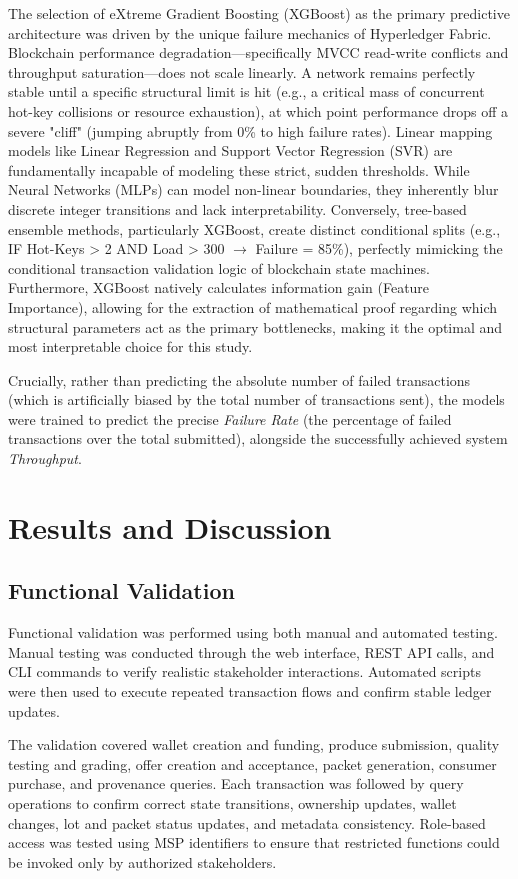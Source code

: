 \documentclass[manuscript,screen]{acmart}
\begin{document}
The selection of eXtreme Gradient Boosting (XGBoost) as the primary predictive architecture was driven by the unique failure mechanics of Hyperledger Fabric. Blockchain performance degradation---specifically MVCC read-write conflicts and throughput saturation---does not scale linearly. A network remains perfectly stable until a specific structural limit is hit (e.g., a critical mass of concurrent hot-key collisions or resource exhaustion), at which point performance drops off a severe "cliff" (jumping abruptly from 0\% to high failure rates). Linear mapping models like Linear Regression and Support Vector Regression (SVR) are fundamentally incapable of modeling these strict, sudden thresholds. While Neural Networks (MLPs) can model non-linear boundaries, they inherently blur discrete integer transitions and lack interpretability. Conversely, tree-based ensemble methods, particularly XGBoost, create distinct conditional splits (e.g., IF Hot-Keys > 2 AND Load > 300 $\rightarrow$ Failure = 85\%), perfectly mimicking the conditional transaction validation logic of blockchain state machines. Furthermore, XGBoost natively calculates information gain (Feature Importance), allowing for the extraction of mathematical proof regarding which structural parameters act as the primary bottlenecks, making it the optimal and most interpretable choice for this study.

Crucially, rather than predicting the absolute number of failed transactions (which is artificially biased by the total number of transactions sent), the models were trained to predict the precise \textit{Failure Rate} (the percentage of failed transactions over the total submitted), alongside the successfully achieved system \textit{Throughput}.

\section{Results and Discussion}
\subsection{Functional Validation}

Functional validation was performed using both manual and automated testing. Manual testing was conducted through the web interface, REST API calls, and CLI commands to verify realistic stakeholder interactions. Automated scripts were then used to execute repeated transaction flows and confirm stable ledger updates.

The validation covered wallet creation and funding, produce submission, quality testing and grading, offer creation and acceptance, packet generation, consumer purchase, and provenance queries. Each transaction was followed by query operations to confirm correct state transitions, ownership updates, wallet changes, lot and packet status updates, and metadata consistency. Role-based access was tested using MSP identifiers to ensure that restricted functions could be invoked only by authorized stakeholders.
\end{document}
